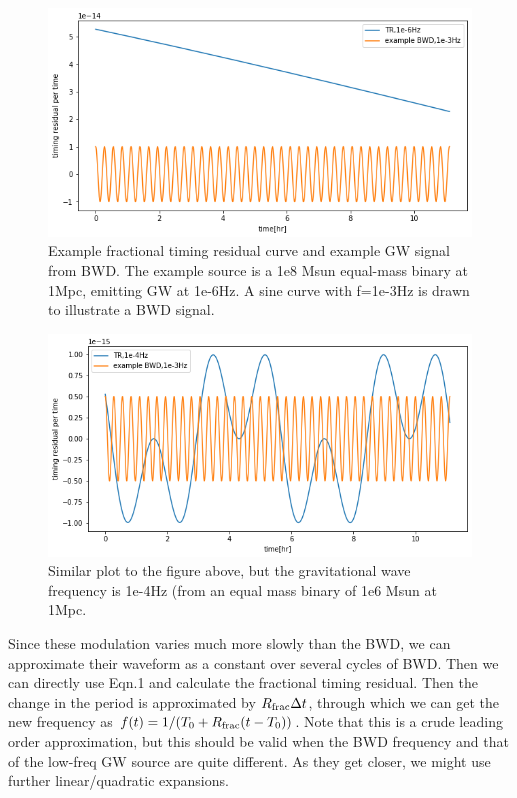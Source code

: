 \documentclass{article}
\begin{document}
\begin{figure}
    \centering
    \includegraphics[scale=.6]{TR.png}
    \caption{Example fractional timing residual curve and example GW signal from BWD. The example source is a 1e8 Msun equal-mass binary at 1Mpc, emitting GW at 1e-6Hz. A sine curve with f=1e-3Hz is drawn to illustrate a BWD signal.}
    \label{TR1}
\end{figure}

\begin{figure}
    \centering
    \includegraphics[scale=.6]{TR2.png}
    \caption{Similar plot to the figure above, but the gravitational wave frequency is 1e-4Hz (from an equal mass binary of 1e6 Msun at 1Mpc.}
    \label{TR2}
\end{figure}

Since these modulation varies much more slowly than the BWD, we can approximate their waveform as a constant over several cycles of BWD. Then we can directly use Eqn.1 and calculate the fractional timing residual. Then the change in the period is approximated by $R_{\rm{frac}}\Delta t$, through which we can get the new frequency as $f(t)=1/(T_0+R_{\rm{frac}}(t-T_0))$. Note that this is a crude leading order approximation, but this should be valid when the BWD frequency and that of the low-freq GW source are quite different. As they get closer, we might use further linear/quadratic expansions. 
\end{document}
